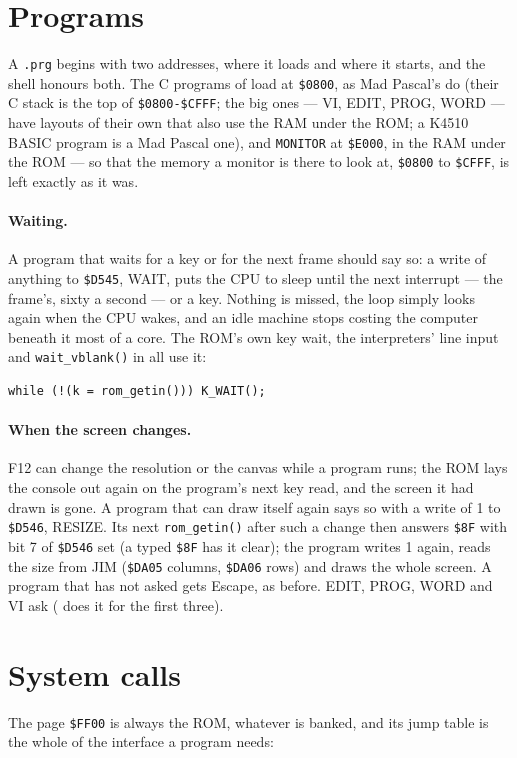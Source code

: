 \section{Programs}
A \texttt{.prg} begins with two addresses, where it loads and where it
starts, and the shell honours both. The C programs of 
load at \texttt{\$0800}, as Mad Pascal's do (their C stack is the top
of \texttt{\$0800-\$CFFF}; the big ones --- VI, EDIT, PROG, WORD ---
have layouts of their own that also use the RAM under the ROM; a K4510
BASIC program is a Mad Pascal one), and \verb|MONITOR| at \texttt{\$E000}, in the
RAM under the ROM --- so that the memory a monitor is there to look at,
\texttt{\$0800} to \texttt{\$CFFF}, is left exactly as it was.

\paragraph{Waiting.} A program that waits for a key or for the next
frame should say so: a write of anything to \texttt{\$D545}, WAIT, puts
the CPU to sleep until the next interrupt --- the frame's, sixty a second
--- or a key. Nothing is missed, the loop simply looks again when the CPU
wakes, and an idle machine stops costing the computer beneath it most of
a core. The ROM's own key wait, the interpreters' line input and
\verb|wait_vblank()| in  all use it:
\begin{verbatim}
while (!(k = rom_getin())) K_WAIT();
\end{verbatim}

\paragraph{When the screen changes.} F12 can change the resolution or
the canvas while a program runs; the ROM lays the console out again on
the program's next key read, and the screen it had drawn is gone. A
program that can draw itself again says so with a write of 1 to
\texttt{\$D546}, RESIZE. Its next \verb|rom_getin()| after such a change
then answers \texttt{\$8F} with bit 7 of \texttt{\$D546} set (a typed
\texttt{\$8F} has it clear); the program writes 1 again, reads the size
from JIM (\texttt{\$DA05} columns, \texttt{\$DA06} rows) and draws the whole
screen. A program that has not asked gets Escape, as before. EDIT,
PROG, WORD and VI ask ( does it for the first three).

\section{System calls}
The page \texttt{\$FF00} is always the ROM, whatever is banked, and its
jump table is the whole of the interface a program needs:

